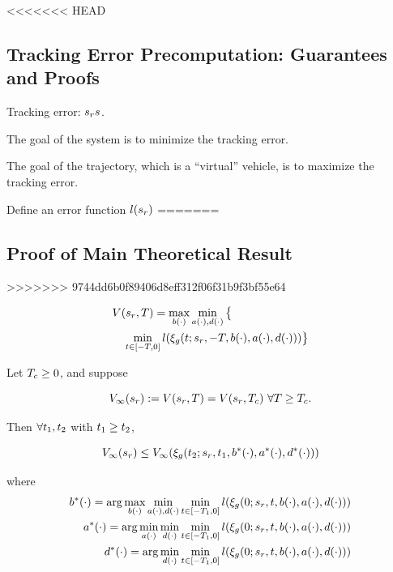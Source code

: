 <<<<<<< HEAD
 \subsection{Tracking Error Precomputation: Guarantees and Proofs}
 
 Tracking error: $s_rs$.
 
 The goal of the system is to minimize the tracking error.
 
 The goal of the trajectory, which is a ``virtual'' vehicle, is to maximize the tracking error.
 
 Define an error function $l(s_r)$
=======
 \subsection{Proof of Main Theoretical Result}
>>>>>>> 9744dd6b0f89406d8eff312f06f31b9f3bf55e64
 
 \begin{equation}
 \begin{aligned}
& V(s_r, T) = \max_{b(\cdot)} \min_{a(\cdot), d(\cdot)} \big\{\\
&\quad \min_{t \in [-T, 0]} l(\xi_g(t; s_r, -T, b(\cdot), a(\cdot), d(\cdot)))\big\} 
 \end{aligned}
  \end{equation}
 
 \begin{thm}
   Let $T_c \ge 0$, and suppose
   
   \begin{equation}
   \label{eq:conv_valfunc}
   V_\infty(s_r) := V(s_r, T) = V(s_r, T_c) ~ \forall T \ge T_c.
   \end{equation}
   
   Then $\forall t_1, t_2$ with $t_1 \ge t_2$,
   
   \begin{equation}
   V_\infty(s_r) \le V_\infty(\xi_g(t_2; s_r, t_1, b^*(\cdot), a^*(\cdot), d^*(\cdot))) 
   \end{equation}
   
   \noindent where
   \begin{equation}
   \begin{aligned}
   b^*(\cdot) = \arg \max_{b(\cdot)} \min_{a(\cdot), d(\cdot)} \min_{t \in [-T_1, 0]} l(\xi_g(0; s_r, t, b(\cdot), a(\cdot), d(\cdot))) \\
   a^*(\cdot) = \arg \min_{a(\cdot)} \min_{d(\cdot)} \min_{t \in [-T_1, 0]} l(\xi_g(0; s_r, t, b(\cdot), a(\cdot), d(\cdot))) \\
   d^*(\cdot) = \arg \min_{d(\cdot)} \min_{t \in [-T_1, 0]} l(\xi_g(0; s_r, t, b(\cdot), a(\cdot), d(\cdot))) 
   \end{aligned}
   \end{equation}
   
 \end{thm}
 
